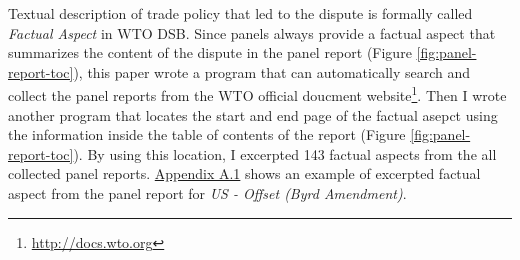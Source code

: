 Textual description of trade policy that 
led to the dispute is formally called 
\textit{Factual Aspect} in WTO DSB. 
Since panels
always provide a factual aspect
that summarizes the content of the dispute
in the panel report (Figure \ref{fig:panel-report-toc}),
this paper wrote a program that can 
automatically search and collect 
the panel reports from the WTO official doucment website\footnote{
    \url{http://docs.wto.org}
}.
Then I wrote another program that locates the start 
and end page of the factual asepct using the information inside the 
table of contents of the report (Figure \ref{fig:panel-report-toc}).
By using this location, I excerpted 143 factual aspects 
from the all collected panel reports. 
\hyperref[sub:factual-aspect-example]{Appendix A.1} shows an
example of excerpted factual aspect from the panel report for \textit{US - Offset (Byrd Amendment)}.





